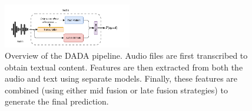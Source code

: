 \documentclass{Interspeech}
\begin{document}


\begin{figure}[t]
  \centering
  \includegraphics[width=0.5\textwidth]{figures/overview.pdf}
  \caption{Overview of the DADA pipeline. Audio files are first transcribed to obtain textual content. Features are then extracted from both the audio and text using separate models. Finally, these features are combined (using either mid fusion or late fusion strategies) to generate the final prediction.}\label{fig:overview}
\end{figure}
\end{document}
